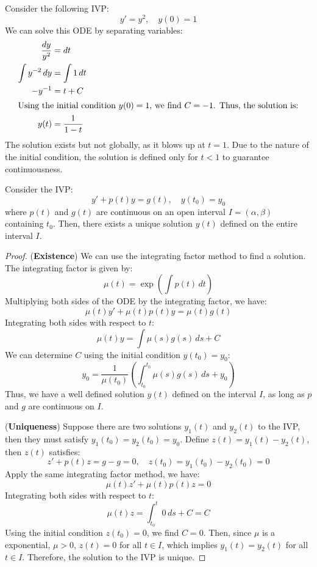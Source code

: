 \documentclass[11pt]{article}
\begin{document}
\begin{example}
    Consider the following IVP:
    $$
    y' = y^2 , \quad y(0) = 1
    $$
    We can solve this ODE by separating variables:
    \begin{align*}
        \frac{dy}{y^2} &= dt \\
        \int y^{-2} \, dy &= \int 1 \, dt \\
        -y^{-1} &= t + C \\
        \intertext{Using the initial condition \( y(0) = 1 \), we find \( C = -1 \). Thus, the solution is:}
        y(t) &= \frac{1}{1 - t}
    \end{align*}
    The solution exists but not globally, as it blows up at \( t = 1 \). Due to the nature of the initial condition, the solution is defined only for \( t < 1 \) to guarantee continuousness.
\end{example}

\begin{theorem}
    Consider the IVP:
    $$
    y' + p(t)y = g(t), \quad y(t_0) = y_0
    $$
    where \( p(t) \) and \( g(t) \) are continuous on an open interval \( I = (\alpha, \beta) \) containing \( t_0 \). Then, there exists a unique solution \( y(t) \) defined on the entire interval \( I \).
\end{theorem}
\begin{proof}
    (\textbf{Existence}) We can use the integrating factor method to find a solution. The integrating factor is given by:
    $$\mu(t) = \exp\left( \int p(t) \, dt \right)
    $$
    Multiplying both sides of the ODE by the integrating factor, we have:
    $$\mu(t) y' + \mu(t) p(t) y = \mu(t) g(t)
    $$
    Integrating both sides with respect to \( t \):
    $$\mu(t)y = \int \mu(s) g(s) \, ds + C
    $$
    We can determine \( C \) using the initial condition \( y(t_0) = y_0 \):
    $$y_0 = \frac{1}{\mu(t_0)}\left( \int_{t_0}^{t_0} \mu(s) g(s) \, ds + y_0 \right)
    $$
    Thus, we have a well defined solution \( y(t) \) defined on the interval \( I \), as long as $p$ and $g$ are continuous on $I$.

    (\textbf{Uniqueness}) Suppose there are two solutions \( y_1(t) \) and \( y_2(t) \) to the IVP, then they must satisfy $y_1(t_0) = y_2(t_0) = y_0$. Define \( z(t) = y_1(t) - y_2(t) \), then \( z(t) \) satisfies:
    $$
    z' + p(t)z = g - g = 0, \quad z(t_0) = y_1(t_0) - y_2(t_0) = 0
    $$
    Apply the same integrating factor method, we have:
    $$\mu(t) z' + \mu(t) p(t) z = 0
    $$
    Integrating both sides with respect to \( t \):
    $$\mu(t)z = \int_{t_0}^{t} 0 \, ds + C = C
    $$
    Using the initial condition \( z(t_0) = 0 \), we find \( C = 0 \). Then, since $\mu$ is a exponential, $\mu > 0$, \( z(t) = 0 \) for all \( t \in I \), which implies \( y_1(t) = y_2(t) \) for all \( t \in I \). Therefore, the solution to the IVP is unique.
\end{proof}
\end{document}
